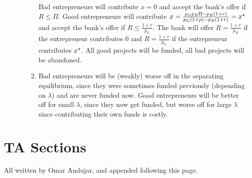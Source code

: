 \documentclass[12pt]{article}
\begin{document}
\begin{enumerate}
\begin{enumerate}
\begin{enumerate}
			Bad entrepreneurs will contribute $x = 0$ and accept the bank's offer if $R \le \Pi$. Good entrepreneurs will contribute $x = \frac{p_Gp_B\Pi - p_B(1+r)}{p_G(1+\rho) - p_B(1+r)} = x^\star$ and accept the bank's offer if $R \le \frac{1+r}{p_G}$. The bank will offer $R = \frac{1+r}{p_B}$ if the entrepreneur contributes 0 and $R = \frac{1+r}{p_G}$ if the entrepreneur contributes $x^\star$. All good projects will be funded, all bad projects will be abandoned.
			\item Bad entrepreneurs will be (weakly) worse off in the separating equilibrium, since they were sometimes funded previously (depending on $\lambda$) and are never funded now. Good entrepreneurs will be better off for small $\lambda$, since they now get funded, but worse off for large $\lambda$ since contributing their own funds is costly.
		\end{enumerate}
	\end{enumerate}
\end{enumerate}





\section{TA Sections}

All written by Omar Andujar, and appended following this page.






















\end{document}
